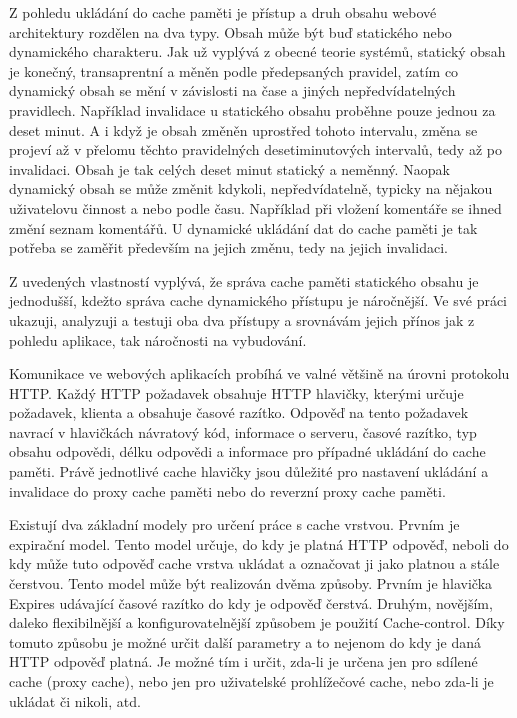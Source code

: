 \documentclass[12pt]{article}
\begin{document}
\obrazek
{}

Z pohledu ukládání do cache paměti je přístup a druh obsahu webové architektury rozdělen na dva typy. Obsah může být buď statického nebo dynamického charakteru. Jak už vyplývá z obecné teorie systémů, statický obsah je konečný, transaprentní a měněn podle předepsaných pravidel, zatím co dynamický obsah se mění v závislosti na čase a jiných nepředvídatelných pravidlech. Například invalidace u statického obsahu proběhne pouze jednou za deset minut. A i když je obsah změněn uprostřed tohoto intervalu, změna se projeví až v přelomu těchto pravidelných desetiminutových intervalů, tedy až po invalidaci. Obsah je tak celých deset minut statický a neměnný. Naopak dynamický obsah se může změnit kdykoli, nepředvídatelně, typicky na nějakou uživatelovu činnost a nebo podle času. Například při vložení komentáře se ihned změní seznam komentářů. U dynamické ukládání dat do cache paměti je tak potřeba se zaměřit především na jejich změnu, tedy na jejich invalidaci.

Z uvedených vlastností vyplývá, že správa cache paměti statického obsahu je jednodušší, kdežto správa cache dynamického přístupu je náročnější. Ve své práci ukazuji, analyzuji a testuji oba dva přístupy a srovnávám jejich přínos jak z pohledu aplikace, tak náročnosti na vybudování.

\label{sec:http-headers}
Komunikace ve webových aplikacích probíhá ve valné většině na úrovni protokolu HTTP. Každý HTTP požadavek obsahuje HTTP hlavičky, kterými určuje požadavek, klienta a obsahuje časové razítko. Odpověď na tento požadavek navrací v hlavičkách návratový kód, informace o serveru, časové razítko, typ obsahu odpovědi, délku odpovědi a informace pro případné ukládání do cache paměti. Právě jednotlivé cache hlavičky jsou důležité pro nastavení ukládání a invalidace do proxy cache paměti nebo do reverzní proxy cache paměti.

Existují dva základní modely pro určení práce s cache vrstvou. Prvním je expirační model. Tento model určuje, do kdy je platná HTTP odpověď, neboli do kdy může tuto odpověď cache vrstva ukládat a označovat ji jako platnou a stále čerstvou. Tento model může být realizován dvěma způsoby. Prvním je hlavička Expires udávající časové razítko do kdy je odpověď čerstvá. Druhým, novějším, daleko flexibilnější a konfigurovatelnější způsobem je použití Cache-control. Díky tomuto způsobu je možné určit další parametry a to nejenom do kdy je daná HTTP odpověď platná. Je možné tím i určit, zda-li je určena jen pro sdílené cache (proxy cache), nebo jen pro uživatelské prohlížečové cache, nebo zda-li je ukládat či nikoli, atd.\cite{rfc-http}
\end{document}
